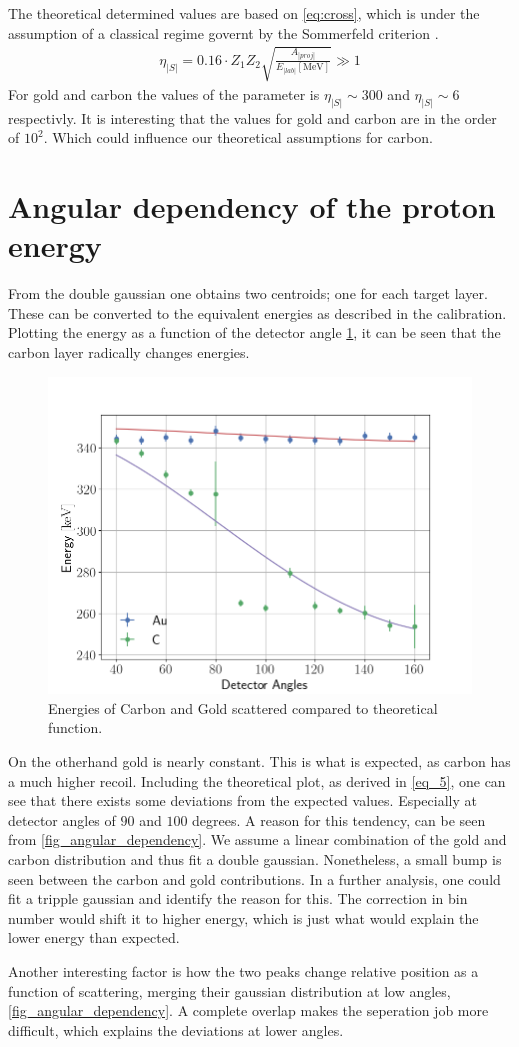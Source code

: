The theoretical determined values are based on \cref{eq:cross}, which is under the assumption of a classical regime governt by the Sommerfeld criterion \parencite[p. 14]{noteBB}.
\begin{align}\label{eq:som}
\eta_|S|=0.16\cdot Z_1Z_2\sqrt{\frac{A_|proj|}{E_|lab|[\si{\mega\electronvolt}]}}\gg 1
\end{align}
For gold and carbon the values of the parameter is $\eta_|S|\sim 300$ and
$\eta_|S|\sim 6$ respectivly. It is interesting that the values for gold and carbon are in the order of $10^2$. Which could influence our theoretical assumptions for carbon. 

\section{Angular dependency of the proton energy}
From the double gaussian one obtains two centroids; one for each target layer.
These can be converted to the equivalent energies as described in the
calibration. Plotting the energy as a function of the detector angle
\cref{fig_energy}, it can be seen that the carbon layer radically changes
energies.
\begin{figure}[h!]
\centering
\includegraphics[width=0.99\columnwidth]{fig_energy}
\caption{Energies of Carbon and Gold scattered compared to theoretical
function.}
\label{fig_energy}
\end{figure}

On the otherhand gold is nearly constant. This is what is expected, as carbon
has a much higher recoil. Including the theoretical plot, as derived in
\cref{eq_5}, one can see that there exists some deviations from the expected
values. Especially at detector angles of $90$ and $100$ degrees.
A reason for this tendency, can be seen from \cref{fig_angular_dependency}. We
assume a linear combination of the gold and carbon distribution and thus fit a
double gaussian. Nonetheless, a small bump is seen between the carbon and gold
contributions. In a further analysis, one could fit a tripple gaussian and
identify the reason for this. The correction in bin number would shift it to
higher energy, which is just what would explain the lower energy than
expected.

Another interesting factor is how the two peaks change relative position as a
function of scattering, merging their gaussian distribution at low angles, \cref{fig_angular_dependency}. A complete overlap makes the seperation job more difficult, which explains the deviations at lower angles.



